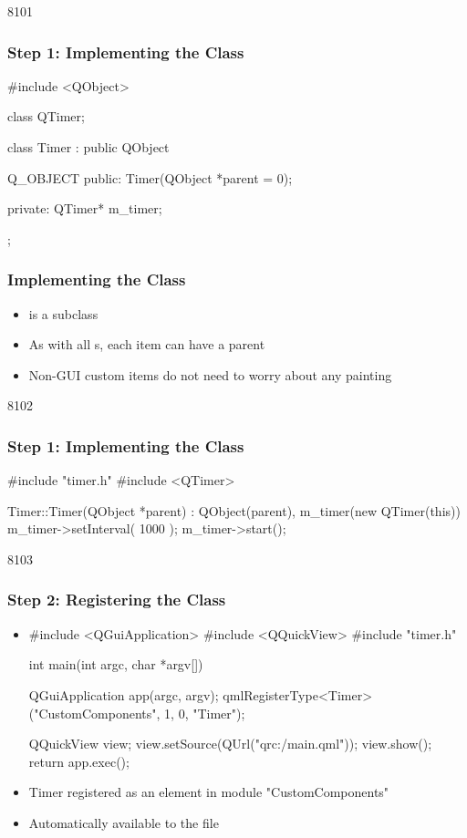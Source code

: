 
\begin{slide}[fragile]{8101}\frametitle{Step 1: Implementing the Class}

\begin{cpp}
#include <QObject>

class QTimer;

class Timer : public QObject
{
    Q_OBJECT
public:
    Timer(QObject *parent = 0);

private:
    QTimer* m_timer;
};
\end{cpp}
\end{slide}


\begin{slide}[fragile]\frametitle{Implementing the Class}
\begin{itemize}
\item {} is a  subclass
\item As with all s, each item can have a parent
\item Non-GUI custom items do not need to worry about any painting
\end{itemize}
\end{slide}


\begin{slide}[fragile]{8102}\frametitle{Step 1: Implementing the Class}
\begin{cpp}
#include "timer.h"
#include <QTimer>

Timer::Timer(QObject *parent)
    : QObject(parent),
      m_timer(new QTimer(this))
{
    m_timer->setInterval( 1000 );
    m_timer->start();
}
\end{cpp}
\end{slide}


\begin{slide}[fragile]{8103}\frametitle{Step 2: Registering the Class}

\begin{itemize}
\item[]
\begin{cpp}
#include <QGuiApplication>
#include <QQuickView>
#include "timer.h"

int main(int argc, char *argv[])
{
    QGuiApplication app(argc, argv);
    qmlRegisterType<Timer>("CustomComponents", 1, 0, "Timer");

    QQuickView view;
    view.setSource(QUrl("qrc:/main.qml"));
    view.show();
    return app.exec();
}
\end{cpp}

\item Timer registered as an element in module "CustomComponents"
\item Automatically available to the  file
\end{itemize}

\end{slide}

